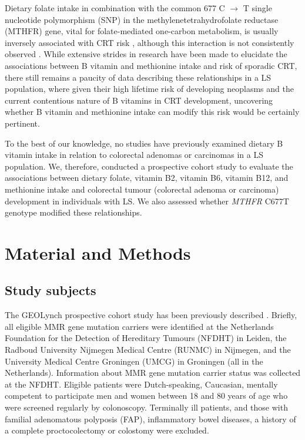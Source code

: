\noindent Dietary folate intake in combination with the common 677 C $\rightarrow$ T single nucleotide polymorphism (SNP) in the methylenetetrahydrofolate reductase (MTHFR) gene, vital for folate-mediated one-carbon metabolism, is usually inversely associated with CRT risk \cite{c624,c625}, although this interaction is not consistently observed \cite{c621,c626,c627}. While extensive strides in research have been made to elucidate the associations between B vitamin and methionine intake and risk of sporadic CRT, there still remains a paucity of data describing these relationships in a LS population, where given their high lifetime risk of developing neoplasms and the current contentious nature of B vitamins in CRT development, uncovering whether B vitamin and methionine intake can modify this risk would be certainly pertinent.

\noindent To the best of our knowledge, no studies have previously examined dietary B vitamin intake in relation to colorectal adenomas or carcinomas in a LS population. We, therefore, conducted a prospective cohort study to evaluate the associations between dietary folate, vitamin B2, vitamin B6, vitamin B12, and methionine intake and colorectal tumour (colorectal adenoma or carcinoma) development in individuals with LS. We also assessed whether \emph{MTHFR} C677T genotype modified these relationships.

\section{Material and Methods} %
\subsection{Study subjects} %
The GEOLynch prospective cohort study has been previously described \cite{c612}. Briefly, all eligible MMR gene mutation carriers were identified at the Netherlands Foundation for the Detection of Hereditary Tumours (NFDHT) in Leiden, the Radboud University Nijmegen Medical Centre (RUNMC) in Nijmegen, and the University Medical Centre Groningen (UMCG) in Groningen (all in the Netherlands). Information about MMR gene mutation carrier status was collected at the NFDHT. Eligible patients were Dutch-speaking, Caucasian, mentally competent to participate men and women between 18 and 80 years of age who were screened regularly by colonoscopy. Terminally ill patients, and those with familial adenomatous polyposis (FAP), inflammatory bowel diseases, a history of a complete proctocolectomy or colostomy were excluded.

